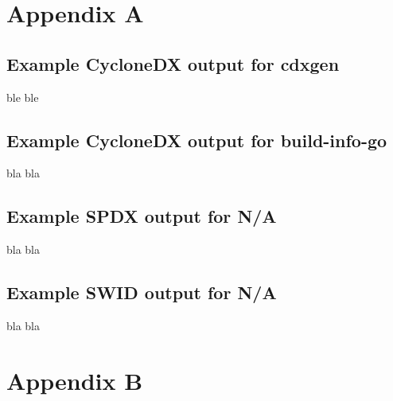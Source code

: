 \appendix
\section{Appendix A}

\subsection{Example CycloneDX output for \textbf{cdxgen}}

ble ble

\subsection{Example CycloneDX output for \textbf{build-info-go}}

bla bla

\subsection{Example SPDX output for \textbf{N/A}}

bla bla


\subsection{Example SWID output for \textbf{N/A}}

bla bla

\section{Appendix B}

